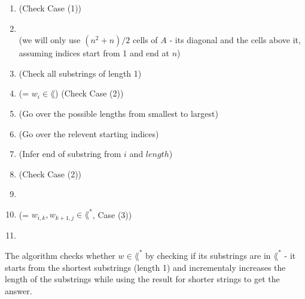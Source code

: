 \begin{enumerate}[1., itemsep=10pt]

    \item {} (Check Case (1))

    \item {} \\
          (we will only use $(n^2+n)/2$ cells of $A$ - its diagonal and the cells above it, \\
          assuming indices start from 1 and end at $n$)


    \item {}                                                  (Check all substrings of length 1)
    \item \qquad  {}                                    (= $w_i \in \lang$) (Check Case (2))

    \item {}                                            (Go over the possible lengths from smallest to largest)
    \item \qquad  {}                             (Go over the relevent starting indices)
    \item \qquad \qquad  {}                                      (Infer end of substring from $i$ and $length$)

    \item \qquad \qquad  {} (Check Case (2))

    \item \qquad \qquad  {}
    \item \qquad \qquad \qquad  {}    (= $w_{i,k}, w_{k+1,j} \in \lang^*$, Case (3))


    \item  {}

\end{enumerate}

The algorithm checks whether $w \in \lang^*$ by checking if its substrings are in $\lang^*$ -
it starts from the shortest substrings (length 1) and incrementaly increases the length
of the substrings while using the result for shorter strings to get the answer. \\

